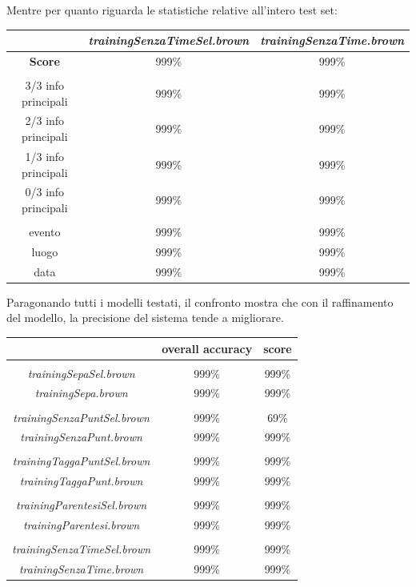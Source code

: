 \documentclass[a4paper]{report}
\begin{document}
Mentre per quanto riguarda le statistiche relative all'intero test set:
\begin{center}
\begin{tabular}{|ccc|}
\hline
 & \textit{trainingSenzaTimeSel.brown} & \textit{trainingSenzaTime.brown}\\
\hline
\textbf{Score} & 999\% & 999\% \\
\hline
 & &  \\
\hline
3/3 info principali & 999\% & 999\% \\
2/3 info principali & 999\% & 999\% \\
1/3 info principali & 999\% & 999\% \\
0/3 info principali & 999\% & 999\% \\
\hline
 & &  \\
\hline
evento & 999\% & 999\% \\
luogo & 999\% & 999\% \\
data & 999\% & 999\% \\
\hline
\end{tabular}
\end{center}
Paragonando tutti i modelli testati, il confronto mostra che con il raffinamento del modello, la precisione del sistema tende a migliorare.
\begin{center}
\begin{tabular}{|ccc|}
\hline
 & \textbf{overall accuracy} & \textbf{score}\\
\hline
 & &  \\
\hline
\textit{trainingSepaSel.brown} & 999\% & 999\% \\
\textit{trainingSepa.brown} & 999\% & 999\% \\
\hline
 & &  \\
\hline
\textit{trainingSenzaPuntSel.brown} & 999\% & 69\% \\
\textit{trainingSenzaPunt.brown} & 999\% & 999\% \\
\hline
 & &  \\
\hline
\textit{trainingTaggaPuntSel.brown} & 999\% & 999\% \\
\textit{trainingTaggaPunt.brown} & 999\% & 999\% \\
\hline
 & &  \\
\hline
\textit{trainingParentesiSel.brown} & 999\% & 999\% \\
\textit{trainingParentesi.brown} & 999\% & 999\% \\
\hline
 & &  \\
\hline
\textit{trainingSenzaTimeSel.brown} & 999\% & 999\% \\
\textit{trainingSenzaTime.brown} & 999\% & 999\% \\
\hline
\end{tabular}
\end{center}
\end{document}

